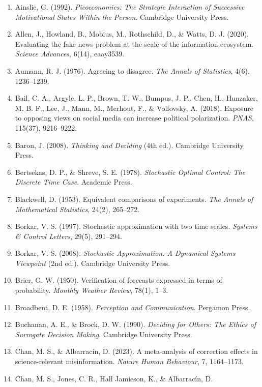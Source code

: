 \documentclass[
  11pt]{article}
\providecommand{\tightlist}{%
  \setlength{\itemsep}{0pt}\setlength{\parskip}{0pt}}
\begin{document}
\begin{enumerate}
\def\labelenumi{\arabic{enumi}.}
\tightlist
\item
  Ainslie, G. (1992). \emph{Picoeconomics: The Strategic Interaction of
  Successive Motivational States Within the Person}. Cambridge
  University Press.
\item
  Allen, J., Howland, B., Mobius, M., Rothschild, D., \& Watts, D. J.
  (2020). Evaluating the fake news problem at the scale of the
  information ecosystem. \emph{Science Advances}, 6(14), eaay3539.
\item
  Aumann, R. J. (1976). Agreeing to disagree. \emph{The Annals of
  Statistics}, 4(6), 1236--1239.
\item
  Bail, C. A., Argyle, L. P., Brown, T. W., Bumpus, J. P., Chen, H.,
  Hunzaker, M. B. F., Lee, J., Mann, M., Merhout, F., \& Volfovsky, A.
  (2018). Exposure to opposing views on social media can increase
  political polarization. \emph{PNAS}, 115(37), 9216--9222.
\item
  Baron, J. (2008). \emph{Thinking and Deciding} (4th ed.). Cambridge
  University Press.
\item
  Bertsekas, D. P., \& Shreve, S. E. (1978). \emph{Stochastic Optimal
  Control: The Discrete Time Case}. Academic Press.
\item
  Blackwell, D. (1953). Equivalent comparisons of experiments. \emph{The
  Annals of Mathematical Statistics}, 24(2), 265--272.
\item
  Borkar, V. S. (1997). Stochastic approximation with two time scales.
  \emph{Systems \& Control Letters}, 29(5), 291--294.
\item
  Borkar, V. S. (2008). \emph{Stochastic Approximation: A Dynamical
  Systems Viewpoint} (2nd ed.). Cambridge University Press.
\item
  Brier, G. W. (1950). Verification of forecasts expressed in terms of
  probability. \emph{Monthly Weather Review}, 78(1), 1--3.
\item
  Broadbent, D. E. (1958). \emph{Perception and Communication}. Pergamon
  Press.
\item
  Buchanan, A. E., \& Brock, D. W. (1990). \emph{Deciding for Others:
  The Ethics of Surrogate Decision Making}. Cambridge University Press.
\item
  Chan, M. S., \& Albarracín, D. (2023). A meta-analysis of correction
  effects in science-relevant misinformation. \emph{Nature Human
  Behaviour}, 7, 1164--1173.
\item
  Chan, M. S., Jones, C. R., Hall Jamieson, K., \& Albarracín, D.

\end{enumerate}
\end{document}

